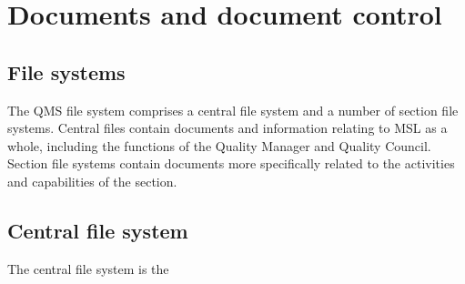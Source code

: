 \section{Documents and document control}
\label{s:documents_and_document_control}
\subsection{File systems}
The QMS file system comprises a central file system and a number of section file systems. Central files contain documents and information relating to MSL as a whole, including the functions of the Quality Manager and Quality Council.  Section file systems contain documents more specifically related to the activities and capabilities of the section.

\subsection{Central file system}
\label{ss:central_file_system}
The central file system is the 

